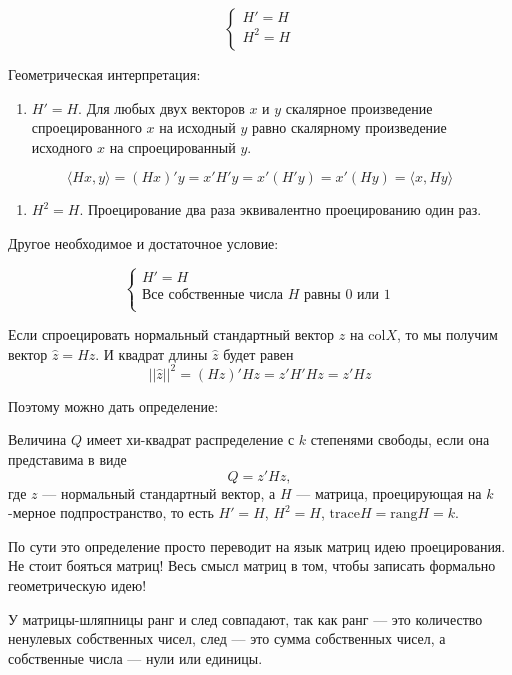\documentclass[11pt,russian,]{article}
\providecommand{\tightlist}{%
  \setlength{\itemsep}{0pt}\setlength{\parskip}{0pt}}
\newcommand{\1}{\mathbbm{1}}
\newcommand{\col}{\mathcal{col}}
\renewcommand{\col}{\mathrm{col}}
\newcommand{\trace}{\mathrm{trace}}
\newcommand{\rang}{\mathrm{rang}}
\begin{document}
\[
\begin{cases}
H' = H \\
H^2 = H \\
\end{cases}
\]

Геометрическая интерпретация:

\begin{enumerate}
\def\labelenumi{\arabic{enumi}.}
\tightlist
\item
  \(H'=H\). Для любых двух векторов \(x\) и \(y\) скалярное произведение
  спроецированного \(x\) на исходный \(y\) равно скалярному произведение
  исходного \(x\) на спроецированный \(y\).
\end{enumerate}

\[
\langle Hx, y\rangle = (Hx)'y = x' H' y = x' (H'y) = x' (Hy) = \langle x, Hy \rangle
\]

\begin{enumerate}
\def\labelenumi{\arabic{enumi}.}
\setcounter{enumi}{1}
\tightlist
\item
  \(H^2=H\). Проецирование два раза эквивалентно проецированию один раз.
\end{enumerate}

Другое необходимое и достаточное условие:

\[
\begin{cases}
H' = H \\
\text{Все собственные числа } H \text{ равны } 0 \text{ или } 1\\
\end{cases}
\]

Если спроецировать нормальный стандартный вектор \(z\) на \(\col X\), то
мы получим вектор \(\hat z = Hz\). И квадрат длины \(\hat z\) будет
равен \[
||\hat z ||^2 = (Hz)'Hz=z'H'Hz = z'Hz
\]

Поэтому можно дать определение:

Величина \(Q\) имеет хи-квадрат распределение с \(k\) степенями свободы,
если она представима в виде \[
Q = z'Hz,
\] где \(z\) --- нормальный стандартный вектор, а \(H\) --- матрица,
проецирующая на \(k\)-мерное подпространство, то есть \(H'=H\),
\(H^2=H\), \(\trace H =\rang H= k\).

По сути это определение просто переводит на язык матриц идею
проецирования. Не стоит бояться матриц! Весь смысл матриц в том, чтобы
записать формально геометрическую идею!

У матрицы-шляпницы ранг и след совпадают, так как ранг --- это
количество ненулевых собственных чисел, след --- это сумма собственных
чисел, а собственные числа --- нули или единицы.
\end{document}
